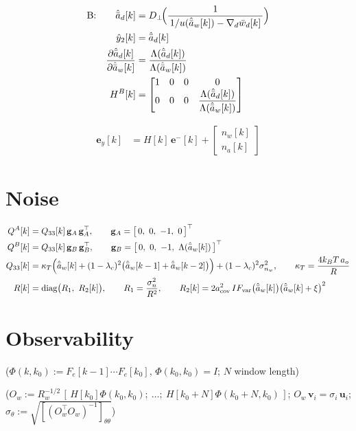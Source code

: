 \documentclass[11pt,a4paper,fontset=none]{ctexart}
\newcommand{\ba}{\bar{a}}
\newcommand{\bw}{\bar{w}}
\newcommand{\ah}{\hat{\ba}_w}
\newcommand{\ad}{\hat{\ba}_d}
\newcommand{\Dp}{D_{\perp}}
\newcommand{\lam}{\Lambda}
\begin{document}
\begin{align*}
\text{B:}\qquad
\ad[k]      &= \Dp\!\Bigl(\frac{1}{\,1/u(\ah[k]) - \nabla_d\bw_d[k]\,}\Bigr) \\
\hat y_2[k] &= \ad[k] \\
\frac{\partial\ad[k]}{\partial\ah[k]} &= \frac{\lam(\ad[k])}{\lam(\ah[k])} \\
H^{B}[k]    &= \begin{bmatrix} 1 & 0 & 0 & 0 \\
               0 & 0 & 0 & \dfrac{\lam(\ad[k])}{\lam(\ah[k])} \end{bmatrix}
\end{align*}

\begin{align*}
\mathbf{e}_y[k] &= H[k]\,\mathbf{e}^{-}[k] + \begin{bmatrix} n_w[k] \\ n_a[k] \end{bmatrix}
\end{align*}

\section{Noise}

\begin{align*}
Q^{A}[k]  &= Q_{33}[k]\,\mathbf{g}_A\,\mathbf{g}_A^{\top}, \qquad \mathbf{g}_A = \bigl[\,0,\ 0,\ -1,\ 0\,\bigr]^{\top} \\
Q^{B}[k]  &= Q_{33}[k]\,\mathbf{g}_B\,\mathbf{g}_B^{\top}, \qquad
\mathbf{g}_B = \bigl[\,0,\ 0,\ -1,\ \lam(\ah[k])\,\bigr]^{\top} \\
Q_{33}[k] &= \kappa_T\Bigl(\ah[k] + (1-\lambda_c)^{2}\bigl(\ah[k-1] + \ah[k-2]\bigr)\Bigr) + (1-\lambda_c)^{2}\sigma^{2}_{n_w},
\qquad \kappa_T = \frac{4k_BT\,a_o}{R} \\
R[k]      &= \mathrm{diag}\bigl(R_1,\ R_2[k]\bigr), \qquad R_1 = \frac{\sigma^{2}_{n}}{R^{2}}, \qquad
R_2[k] = 2a_{\mathrm{cov}}^{2}\,IF_{\mathrm{var}}\bigl(\ah[k]\bigr)\bigl(\ah[k] + \xi\bigr)^{2}
\end{align*}

\clearpage
\section{Observability}

($\Phi(k,k_0) := F_e[k-1]\cdots F_e[k_0]$, $\Phi(k_0,k_0) = I$; $N$ window length)

($O_w := R_w^{-1/2}\,[\,H[k_0]\Phi(k_0,k_0);\ \dots;\ H[k_0+N]\Phi(k_0+N,k_0)\,]$;
$O_w\,\mathbf{v}_i = \sigma_i\,\mathbf{u}_i$; $\sigma_\theta := \sqrt{[(O_w^{\top}O_w)^{-1}]_{\theta\theta}}$)
\end{document}
